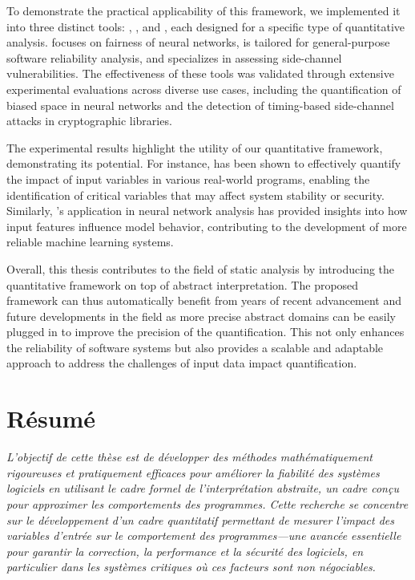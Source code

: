 To demonstrate the practical applicability of this framework, we implemented it into three distinct tools: \libra, \impatto, and \timesec, each designed for a specific type of quantitative analysis. \libra{} focuses on fairness of neural networks, \impatto{} is tailored for general-purpose software reliability analysis, and \timesec{} specializes in assessing side-channel vulnerabilities. The effectiveness of these tools was validated through extensive experimental evaluations across diverse use cases, including the quantification of biased space in neural networks and the detection of timing-based side-channel attacks in cryptographic libraries.

The experimental results highlight the utility of our quantitative framework, demonstrating its potential. For instance, \timesec{} has been shown to effectively quantify the impact of input variables in various real-world programs, enabling the identification of critical variables that may affect system stability or security. Similarly, \libra's application in neural network analysis has provided insights into how input features influence model behavior, contributing to the development of more reliable machine learning systems.

Overall, this thesis contributes to the field of static analysis by introducing the quantitative framework on top of abstract interpretation. The proposed framework can thus automatically benefit from years of recent advancement and future developments in the field as more precise abstract domains can be easily plugged in to improve the precision of the quantification. This not only enhances the reliability of software systems but also provides a scalable and adaptable approach to address the challenges of input data impact quantification.


\chapter*{Résumé}

\emph{L'objectif de cette thèse est de développer des méthodes mathématiquement rigoureuses et pratiquement efficaces pour améliorer la fiabilité des systèmes logiciels en utilisant le cadre formel de l'interprétation abstraite, un cadre conçu pour approximer les comportements des programmes. Cette recherche se concentre sur le développement d'un cadre quantitatif permettant de mesurer l'impact des variables d'entrée sur le comportement des programmes—une avancée essentielle pour garantir la correction, la performance et la sécurité des logiciels, en particulier dans les systèmes critiques où ces facteurs sont non négociables.}

